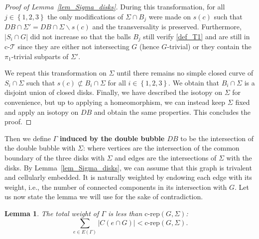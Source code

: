 \documentclass[11pt,a4paper]{article}
\newcommand\ens[1]{\left\{ #1 \right\}}
\newcommand{\bfdex}[1]{\textbf{#1}\index{#1}}
\newcommand{\comprep}{\text{c-rep}}
\newcommand{\cT}{\text{c-}\mathcal{T}}
\newtheorem{lem}[theorem]{Lemma}
\begin{document}
\begin{proof}[Proof of Lemma~\ref{lem_Sigma_disks}]
During this transformation, for all $j \in \ens{1,2,3}$ the only modifications of $\Sigma \cap B_j$ were made on $s(c)$ such that $DB \cap \Sigma' = DB \cap \Sigma \smallsetminus s(c)$ and the transversality is preserved. 
Furthermore, $|S_i \cap G|$ did not increase so that the balls $B_j$ still verify \ref{def_T1} and are still in $\cT$ since they are either not intersecting $G$ (hence $G$-trivial) or they contain the $\pi_1$-trivial subparts of $\Sigma'$.

We repeat this transformation on $\Sigma$ until there remains no simple closed curve of $S_i \cap \Sigma$ such that $s(c) \not \subset B_i \cap \Sigma$ for all $i \in \ens{1,2,3}$. We obtain that $B_i \cap \Sigma$ is a disjoint union of closed disks. Finally, we have described the isotopy on $\Sigma$ for convenience, but up to applying a homeomorphism, we can instead keep $\Sigma$ fixed and apply an isotopy on $DB$ and obtain the same properties. This concludes the proof.
\end{proof}


 Then we define $\Gamma$ \bfdex{induced by the double bubble $DB$} to be the intersection of the double bubble with $\Sigma$: where vertices are the intersection of the common boundary of the three disks with $\Sigma$ and edges are the intersections of $\Sigma$ with the disks. By Lemma~\ref{lem_Sigma_disks}, we can assume that this graph is trivalent and cellularly embedded. It is naturally weighted by endowing each edge with its weight, i.e., the number of connected components in its intersection with $G$. Let us now state the lemma we will use for the sake of contradiction.

\begin{lem}\label{lem_contrad_compress}
The total weight of $\Gamma$ is less than $\comprep(G, \Sigma)$: 
\begin{equation*}
\sum_{e \in E(\Gamma)} |C(e \cap G)| < \comprep(G, \Sigma).
\end{equation*}
\end{lem}
\end{document}
